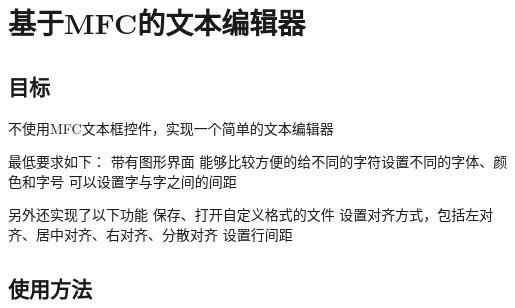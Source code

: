 \section*{基于\+M\+F\+C的文本编辑器 }

\subsection*{目标 }


\begin{DoxyEnumerate}
\item 不使用\+M\+F\+C文本框控件，实现一个简单的文本编辑器
\item 最低要求如下： 带有图形界面 能够比较方便的给不同的字符设置不同的字体、颜色和字号 可以设置字与字之间的间距
\item 另外还实现了以下功能 保存、打开自定义格式的文件 设置对齐方式，包括左对齐、居中对齐、右对齐、分散对齐 设置行间距
\end{DoxyEnumerate}

\subsection*{使用方法 }


